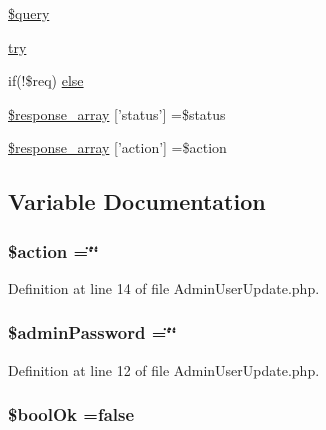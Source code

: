\begin{DoxyCompactItemize}
\item 
\hyperlink{_admin_user_update_8php_af59a5f7cd609e592c41dc3643efd3c98}{\$query}
\item 
\hyperlink{_admin_user_update_8php_abe4cc9788f52e49485473dc699537388}{try}
\item 
if(!\$req) \hyperlink{_admin_user_update_8php_a93f1e974f12c5c233a1b622cf0cb96e7}{else}
\item 
\hyperlink{_admin_user_update_8php_acd0903a7a32e8397aefd0ce8b7dbd1ab}{\$response\-\_\-array} \mbox{[}'status'\mbox{]} =\$status
\item 
\hyperlink{_admin_user_update_8php_ae768978a0cdc416c0d63d798c85c8784}{\$response\-\_\-array} \mbox{[}'action'\mbox{]} =\$action
\end{DoxyCompactItemize}


\subsection{Variable Documentation}
\hypertarget{_admin_user_update_8php_aa698a3e72116e8e778be0e95d908ee30}{
\subsubsection[{\$action}]{\setlength{\rightskip}{0pt plus 5cm}\$action =\char`\"{}\char`\"{}}}\label{_admin_user_update_8php_aa698a3e72116e8e778be0e95d908ee30}


Definition at line 14 of file Admin\-User\-Update.\-php.

\hypertarget{_admin_user_update_8php_a5718fc74710979724218d4ebd530c0cf}{
\subsubsection[{\$admin\-Password}]{\setlength{\rightskip}{0pt plus 5cm}\$admin\-Password =\char`\"{}\char`\"{}}}\label{_admin_user_update_8php_a5718fc74710979724218d4ebd530c0cf}


Definition at line 12 of file Admin\-User\-Update.\-php.

\hypertarget{_admin_user_update_8php_a33e92d112f4ecaf9f88cfee111d7ffdf}{
\subsubsection[{\$bool\-Ok}]{\setlength{\rightskip}{0pt plus 5cm}\$bool\-Ok =false}}\label{_admin_user_update_8php_a33e92d112f4ecaf9f88cfee111d7ffdf}


